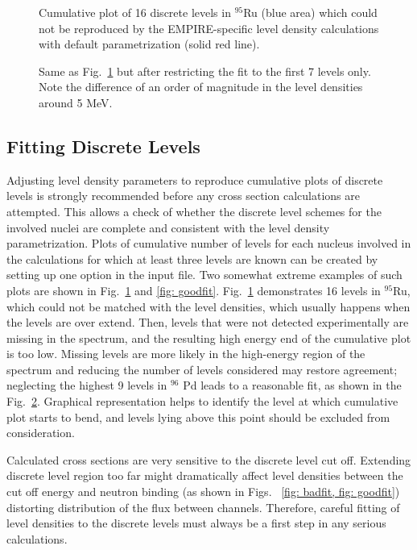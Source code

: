 \begin{figure}[tbp]
\caption{Cumulative plot of 16 discrete levels in $^{95}$Ru (blue area)
which could not be reproduced by the EMPIRE-specific level density
calculations with default parametrization (solid red line).}
\label{fig: badfit}
\end{figure}

\begin{figure}[tbp]
\caption{Same as Fig.~\protect\ref{fig: badfit} but after restricting the
fit to the first 7 levels only. Note the difference of an order of magnitude
in the level densities around 5 MeV.}
\label{fig: goodfit}
\end{figure}

\subsection{Fitting Discrete Levels}

Adjusting level density parameters to reproduce cumulative plots of discrete
levels is strongly recommended before any cross section calculations are
attempted. This allows a check of whether the discrete level schemes for the
involved nuclei are complete and consistent with the level density
parametrization. Plots of cumulative number of levels for each nucleus
involved in the calculations for which at least three levels are known can
be created by setting up one option in the input file. Two somewhat extreme
examples of such plots are shown in Fig.~\ref{fig: badfit} and \ref{fig:
goodfit}. Fig.~\ref{fig: badfit} demonstrates 16 levels in $^{95}$Ru, which
could not be matched with the level densities, which usually happens when
the levels are over extend. Then, levels that were not detected
experimentally are missing in the spectrum, and the resulting high energy
end of the cumulative plot is too low. Missing levels are more likely in the
high-energy region of the spectrum and reducing the number of levels
considered may restore agreement; neglecting the highest 9 levels in $^{96}$%
Pd leads to a reasonable fit, as shown in the Fig.~\ref{fig: goodfit}.
Graphical representation helps to identify the level at which cumulative
plot starts to bend, and levels lying above this point should be excluded
from consideration.

Calculated cross sections are very sensitive to the discrete level cut off.
Extending discrete level region too far might dramatically affect level
densities between the cut off energy and neutron binding (as shown in Figs.~%
\ref{fig: badfit, fig: goodfit}) distorting distribution of the flux between
channels. Therefore, careful fitting of level densities to the discrete
levels must always be a first step in any serious calculations.

